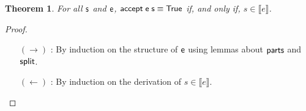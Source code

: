 \documentclass[sigplan]{acmart}
\newtheorem{Theorem}{Theorem}
\theoremstyle{definition}
\newcommand{\sembrackets}[1]{\ensuremath{\llbracket #1 \rrbracket}}
\newcommand{\C}[1]{\red{\mathsf{#1}}}
\newcommand{\F}[1]{\green{\mathsf{#1}}}
\newcommand{\V}[1]{\black{\mathsf{#1}}}
\begin{document}
\begin{Theorem}
   For all \ensuremath{\V{s}} and \ensuremath{\V{e}}, \ensuremath{\F{accept}\;\V{e}\;\V{s}\equiv \C{True}} if, and only if, $s\in\sembrackets{e}$.
\end{Theorem}
\begin{proof}
   $\,$\\
   \begin{itemize}
      \item[$(\to)$]: By induction on the structure of \ensuremath{\V{e}} using lemmas about \ensuremath{\F{parts}} and \ensuremath{\F{split}}.
      \item[$(\leftarrow)$]: By induction on the derivation of $s \in\sembrackets{e}$.
   \end{itemize}
\end{proof}
\end{document}
